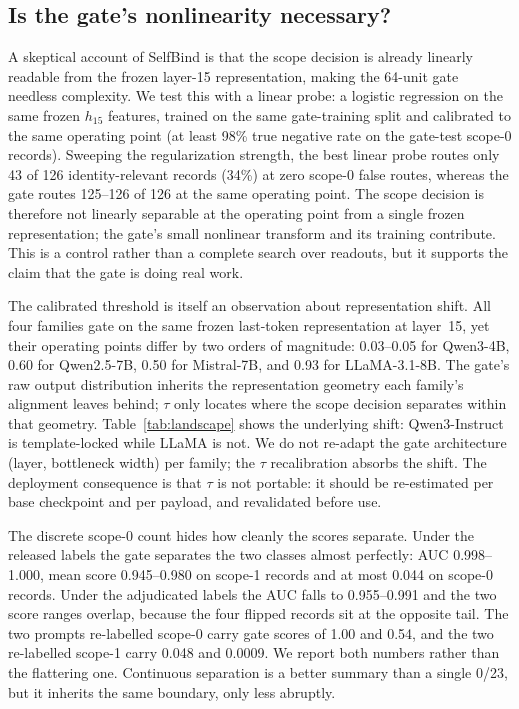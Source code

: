 \documentclass[11pt]{article}
\begin{document}
\subsection{Is the gate's nonlinearity necessary?}
A skeptical account of SelfBind is that the scope decision is already linearly readable from the frozen layer-15 representation, making the 64-unit gate needless complexity. We test this with a linear probe: a logistic regression on the same frozen $h_{15}$ features, trained on the same gate-training split and calibrated to the same operating point (at least 98\% true negative rate on the gate-test scope-0 records). Sweeping the regularization strength, the best linear probe routes only 43 of 126 identity-relevant records (34\%) at zero scope-0 false routes, whereas the gate routes 125--126 of 126 at the same operating point. The scope decision is therefore not linearly separable at the operating point from a single frozen representation; the gate's small nonlinear transform and its training contribute. This is a control rather than a complete search over readouts, but it supports the claim that the gate is doing real work.

The calibrated threshold is itself an observation about representation shift. All four families gate on the same frozen last-token representation at layer~15, yet their operating points differ by two orders of magnitude: 0.03--0.05 for Qwen3-4B, 0.60 for Qwen2.5-7B, 0.50 for Mistral-7B, and 0.93 for LLaMA-3.1-8B. The gate's raw output distribution inherits the representation geometry each family's alignment leaves behind; $\tau$ only locates where the scope decision separates within that geometry. Table~\ref{tab:landscape} shows the underlying shift: Qwen3-Instruct is template-locked while LLaMA is not. We do not re-adapt the gate architecture (layer, bottleneck width) per family; the $\tau$ recalibration absorbs the shift. The deployment consequence is that $\tau$ is not portable: it should be re-estimated per base checkpoint and per payload, and revalidated before use.

The discrete scope-0 count hides how cleanly the scores separate. Under the released labels the gate separates the two classes almost perfectly: AUC 0.998--1.000, mean score 0.945--0.980 on scope-1 records and at most 0.044 on scope-0 records. Under the adjudicated labels the AUC falls to 0.955--0.991 and the two score ranges overlap, because the four flipped records sit at the opposite tail. The two prompts re-labelled scope-0 carry gate scores of 1.00 and 0.54, and the two re-labelled scope-1 carry 0.048 and 0.0009. We report both numbers rather than the flattering one. Continuous separation is a better summary than a single 0/23, but it inherits the same boundary, only less abruptly.
\end{document}

